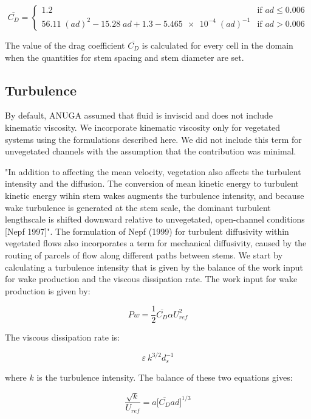 \documentclass[11pt]{article}
\begin{document}
\[
 \overline{C_D} = 
  \begin{cases} 
   1.2 & \text{if } a d \leq 0.006 \\
   56.11\;(ad)^2 - 15.28\;ad + 1.3 - \num{5.465e-4}\;(ad)^{-1}       & \text{if } ad > 0.006
  \end{cases}
\]

The value of the drag coefficient $\overline{C_D}$ is calculated for every cell in the domain when the quantities for stem spacing and stem diameter are set.

\subsection{Turbulence}

By default, ANUGA assumed that fluid is inviscid and does not include kinematic viscosity. We incorporate kinematic viscosity only for vegetated systems using the formulations described here. We did not include this term for unvegetated channels with the assumption that the contribution was minimal.

"In addition to affecting the mean velocity, vegetation also affects the turbulent intensity and the diffusion. The conversion of mean kinetic energy to turbulent kinetic energy wihin stem wakes augments the turbulence intensity, and because wake turbulence is generated at the stem scale, the dominant turbulent lengthscale is shifted downward relative to unvegetated, open-channel conditions [Nepf 1997]". The formulation of Nepf (1999) for turbulent diffusivity within vegetated flows also incorporates a term for mechanical diffusivity, caused by the routing of parcels of flow along different paths between stems. We start by calculating a turbulence intensity that is given by the balance of the work input for wake production and the viscous dissipation rate. The work input for wake production is given by:

\begin{equation}
Pw = \frac{1}{2}\overline{C_D} \alpha U_{ref}^2
\end{equation}

The viscous dissipation rate is:

\begin{equation}
\varepsilon ~ k^{3/2} d_s^{-1}
\end{equation}

\noindent where $k$ is the turbulence intensity. The balance of these two equations gives:

\begin{equation}
\frac{\sqrt{k}}{U_{ref}} = a\big[\overline{C_D} ad\big]^{1/3}
\end{equation}
\end{document}
